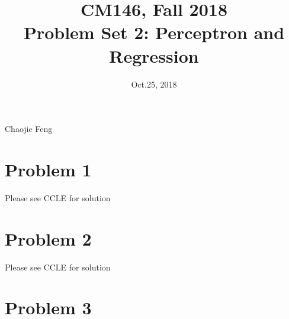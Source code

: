 \documentclass[11pt]{article}
\newcommand{\cnum}{CM146}
\newcommand{\ced}{Fall 2018}
\newcommand{\ctitle}[3]{\title{\vspace{-0.5in}\cnum, \ced\\Problem Set #1: #2}}
\newcommand{\solution}[1]{{{\color{black}{\bf Solution:} {#1}}}}
\begin{document}
\ctitle{2}{Perceptron and Regression}
\author{Chaojie Feng}
\date{Oct.25, 2018}
\maketitle
\vspace{-0.75in}

\section{Problem 1}
\solution{Please see CCLE for solution}
\section{Problem 2}
\solution{Please see CCLE for solution}
\section{Problem 3}
\end{document}
